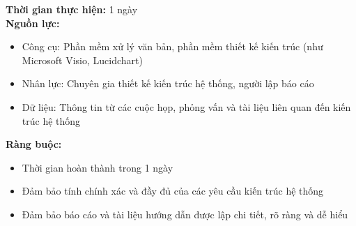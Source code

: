 {\begin{minipage}{\textwidth}
\begin{itemize}
    \end{itemize}
    \noindent \textbf{Thời gian thực hiện:} 1 ngày \\
    \noindent \textbf{Nguồn lực:}
    \begin{itemize}
        \item Công cụ: Phần mềm xử lý văn bản, phần mềm thiết kế kiến trúc (như Microsoft Visio, Lucidchart)
        \item Nhân lực: Chuyên gia thiết kế kiến trúc hệ thống, người lập báo cáo
        \item Dữ liệu: Thông tin từ các cuộc họp, phỏng vấn và tài liệu liên quan đến kiến trúc hệ thống
    \end{itemize}
    \noindent \textbf{Ràng buộc:}
    \begin{itemize}
        \item Thời gian hoàn thành trong 1 ngày
        \item Đảm bảo tính chính xác và đầy đủ của các yêu cầu kiến trúc hệ thống
        \item Đảm bảo báo cáo và tài liệu hướng dẫn được lập chi tiết, rõ ràng và dễ hiểu
    \end{itemize}
    \end{minipage}
}
\newpage %
